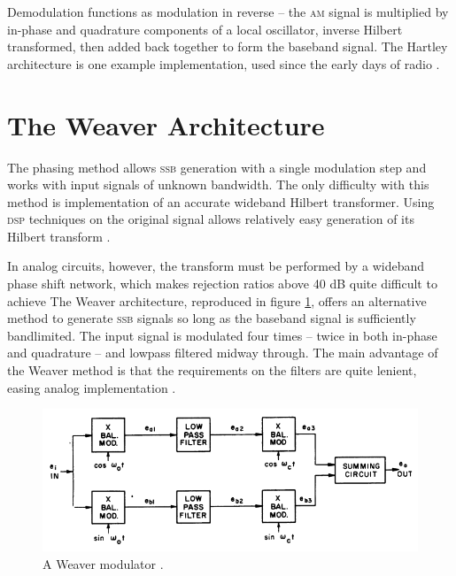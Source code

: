 \documentclass[12pt]{article}
\newcommand{\rf}{\textsc{am}\xspace}
\newcommand{\ssb}{\textsc{ssb}\xspace}
\begin{document}
Demodulation functions as modulation in reverse -- the \rf signal is multiplied
by in-phase and quadrature components of a local oscillator, inverse Hilbert
transformed, then added back together to form the baseband signal. The Hartley
architecture is one example implementation, used since the early days of radio
\autocite{rf-microelectronics}.

\section*{The Weaver Architecture}

\newcommand{\oo}{\omega_o}
\newcommand{\oc}{\omega_c}

The phasing method allows \ssb generation with a single modulation step and
works with input signals of unknown bandwidth. The only difficulty with this
method is implementation of an accurate wideband Hilbert transformer. Using
\textsc{dsp} techniques on the original signal allows relatively easy
generation of its Hilbert transform \autocite{ssb-tretter}.

In analog circuits, however, the transform must be performed by a wideband
phase shift network, which makes rejection ratios above 40 dB quite difficult
to achieve The Weaver architecture, reproduced in figure
\ref{fig:weaver-from-paper}, offers an alternative method to generate \ssb
signals so long as the baseband signal is sufficiently bandlimited. The input
signal is modulated four times -- twice in both in-phase and quadrature -- and
lowpass filtered midway through. The main advantage of the Weaver method is
that the requirements on the filters are quite lenient, easing analog
implementation \autocite{weaver-himself}.

\begin{figure}[h]
	\centering
	\includegraphics[width=.9\textwidth]{weaver-from-paper.png}
	\caption{A Weaver modulator \autocite{weaver-himself}.}
	\label{fig:weaver-from-paper}
\end{figure}
\end{document}
